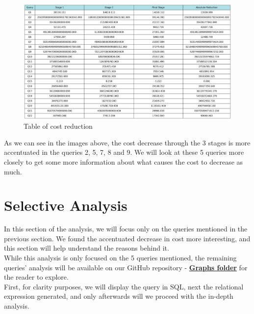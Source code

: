 \documentclass[a4paper,12pt]{scrreprt}
\begin{document}
\begin{figure}[H]
    \includegraphics[width = 1.45\textwidth, height = 0.40\textheight, keepaspectratio]{img_cost_differential/cost_reduction_table.png}
    \caption{Table of cost reduction}
    \label{fig:tab1}
\end{figure}

As we can see in the images above, the cost decrease through the 3 stages is more accentuated in the queries 2, 5, 7, 8 and 9. We will look at these 5 queries more closely to get some more information about what causes the cost to decrease as much.

\section{Selective Analysis}
In this section of the analysis, we will focus only on the queries mentioned in the previous section. We found the accentuated decrease in cost more interesting, and this section will help understand the reasons behind it. \\

While this analysis is only focused on the 5 queries mentioned, the remaining queries' analysis will be available on our GitHub repository - \textbf{\href{https://github.com/Blackparkd/risinglight/tree/main/src/planner/outputs/graphs}{Graphs folder}} for the reader to explore. \\

First, for clarity purposes, we will display the query in SQL, next the relational expression generated, and only afterwards will we proceed with the in-depth analysis.
\end{document}
